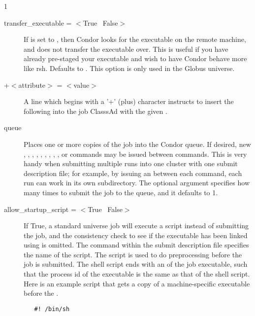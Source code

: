 \begin{ManPage}{\label{man-condor-submit}}{1}
\begin{description}

\item[transfer\_executable = $<$True \Bar\ False$>$] If  is set to
, then Condor looks for the executable on the remote machine, and
does not transfer the executable over.
This is useful if you have already pre-staged your
executable and wish to have Condor behave more like rsh.
Defaults to .
This option is only used in the Globus universe.


\item[+$<$attribute$>$ = $<$value$>$] A line which begins with a '+'
(plus) character instructs  to insert the
following  into the job ClasssAd with the given 
. 


\item[queue ] Places one or more
copies of the job into
the Condor queue. If desired, new , ,
, , , ,
, , , or 
commands may be issued between  commands. This is very handy
when submitting multiple runs into one cluster with one submit description
file;
for example, by issuing an  between each 
command, each run can work in its own subdirectory.
The optional
argument  specifies how many times to submit the
job to the queue, and it defaults to 1.

\item[allow\_startup\_script = $<$True \Bar\ False$>$]
If True, a standard universe job will execute a script
instead of submitting the job,
and the consistency check to see if the executable has
been linked using  is omitted.
The  command within the submit description
file specifies the name of the script.
The script is used to do preprocessing before the
job is submitted.
The shell script ends with an  of the
job executable, such that the process id of the executable is the
same as that of the shell script.
Here is an example script that gets a copy of a machine-specific
executable before the .
\begin{verbatim} 
   #! /bin/sh


\end{verbatim}
\end{description}
\end{ManPage}
